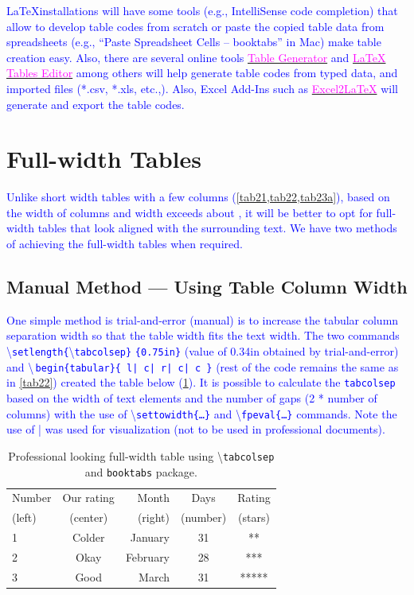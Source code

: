 \documentclass[phd]{ndsu-thesis-2022}
\newcommand\italk[1]{\textcolor{blue}{#1}}  %
\newcommand\cmd[1]{\textbackslash\texttt{#1}}  %
\newcommand\vb[1]{\textcolor{blue}{\texttt{#1}}}%
\newcommand\vbc[1]{\textcolor{blue}{\textbackslash\,\texttt{#1}}}%
\begin{document}
\italk{\LaTeX installations will have some tools (e.g., IntelliSense code completion) that allow to develop table codes from scratch or paste the copied table data from spreadsheets (e.g., ``Paste Spreadsheet Cells -- booktabs'' in Mac) make table creation easy. Also, there are several online tools \href{https://www.tablesgenerator.com}{\textcolor{magenta}{Table Generator}} and \href{https://www.latex-tables.com}{\textcolor{magenta}{LaTeX Tables Editor}} among others will help generate table codes from typed data, and imported files (*.csv, *.xls, etc.,). Also, Excel Add-Ins such as \href{https://ctan.org/tex-archive/support/excel2latex?lang=en}{\textcolor{magenta}{Excel2\LaTeX}} will generate and export the table codes. 
}

\section{Full-width Tables}
\italk{Unlike short width tables with a few columns (\cref{tab21,tab22,tab23a}), based on the width of columns and width exceeds about \pr{60}, it will be better to opt for full-width tables that look aligned with the surrounding text. We have two methods of achieving the full-width tables when required.}

\subsection{Manual Method --- Using Table Column Width}
\italk{One simple method is trial-and-error (manual) is to increase the tabular column separation width so that the table width fits the text width. The two commands \cmd{setlength\{}\cmd{tabcolsep\}} \vb{\{0.75in\}} (value of 0.34in obtained by trial-and-error) and \vbc{begin\{tabular\}\{ l|   c|   r|   c|   c \}} (rest of the code remains the same as in \cref{tab22}) created the table below (\cref{tab23}). It is possible to calculate the \vb{tabcolsep} based on the width of text elements and the number of gaps (2 * number of columns) with the use of \cmd{settowidth\{\ldots\}} and \cmd{fpeval\{\ldots\}} commands. Note the use of | was used for visualization (not to be used in professional documents).} 

\begin{table}[ht!]
\centering
\caption{Professional looking full-width table using \cmd{tabcolsep} and \texttt{booktabs} package.}
\setlength{\tabcolsep}{0.34in}
\begin{tabular}{ l|   c|   r|   c|   c}
\toprule
Number & Our rating & Month & Days & Rating\\
(left) & (center)   & (right) & (number) & (stars)\\
\midrule
1 & Colder & January & 31 & **\\
2 & Okay   & February & 28 & ***\\
3 & Good   & March & 31 & *****\\
\bottomrule
\end{tabular}
\label{tab23}
\end{table}
\end{document}
